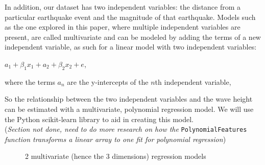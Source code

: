 \documentclass[11pt,letterpaper]{article}
\begin{document}
In addition, our dataset has two independent variables: the distance from a particular
earthquake event and the magnitude of that earthquake. Models such as the one explored
in this paper, where multiple independent variables are present, are called multivariate
and can be modeled by adding the terms of a new independent variable, as such
for a linear model with two independent variables:

$a_1 + \beta_1 x_1 + a_2 + \beta_2 x_2 + e$,

where the terms $a_n$ are the y-intercepts of the $n$th independent variable,

So the relationship between the two independent variables and the wave height can
be estimated with a multivariate, polynomial regression model. We will use the Python
scikit-learn library to aid in creating this model. \\

(\textit{Section not done, need to do more research on how the} \verb|PolynomialFeatures| 
\textit{function transforms a linear array to one fit for polynomial regression})


\begin{figure}[H]
    \centering
    \qquad
    \caption{2 multivariate (hence the 3 dimensions) regression models}
    \label{fig:example}
\end{figure}
\end{document}
